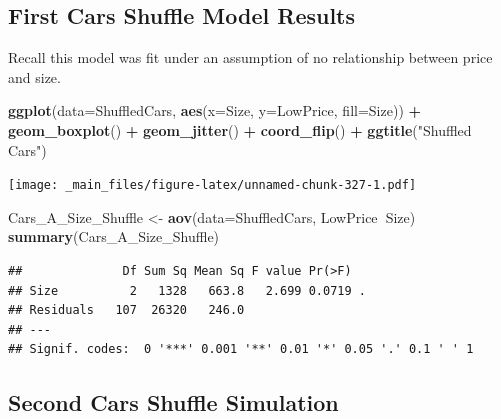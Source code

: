 \documentclass[]{book}
\newenvironment{Shaded}{\begin{snugshade}}{\end{snugshade}}
\newcommand{\KeywordTok}[1]{\textcolor[rgb]{0.13,0.29,0.53}{\textbf{#1}}}
\newcommand{\DataTypeTok}[1]{\textcolor[rgb]{0.13,0.29,0.53}{#1}}
\newcommand{\DecValTok}[1]{\textcolor[rgb]{0.00,0.00,0.81}{#1}}
\newcommand{\StringTok}[1]{\textcolor[rgb]{0.31,0.60,0.02}{#1}}
\newcommand{\OperatorTok}[1]{\textcolor[rgb]{0.81,0.36,0.00}{\textbf{#1}}}
\newcommand{\NormalTok}[1]{#1}
\begin{document}
\subsection{First Cars Shuffle Model
Results}\label{first-cars-shuffle-model-results-1}

Recall this model was fit under an assumption of no relationship between
price and size.

\begin{Shaded}
\begin{Highlighting}[]
\KeywordTok{ggplot}\NormalTok{(}\DataTypeTok{data=}\NormalTok{ShuffledCars, }\KeywordTok{aes}\NormalTok{(}\DataTypeTok{x=}\NormalTok{Size, }\DataTypeTok{y=}\NormalTok{LowPrice, }\DataTypeTok{fill=}\NormalTok{Size)) }\OperatorTok{+}\StringTok{ }
\StringTok{  }\KeywordTok{geom_boxplot}\NormalTok{() }\OperatorTok{+}\StringTok{ }\KeywordTok{geom_jitter}\NormalTok{() }\OperatorTok{+}\StringTok{ }\KeywordTok{coord_flip}\NormalTok{() }\OperatorTok{+}\StringTok{ }\KeywordTok{ggtitle}\NormalTok{(}\StringTok{"Shuffled Cars"}\NormalTok{)}
\end{Highlighting}
\end{Shaded}

\texttt{[image: \_main\_files/figure-latex/unnamed-chunk-327-1.pdf]}

\begin{Shaded}
\begin{Highlighting}[]
\NormalTok{Cars_A_Size_Shuffle <-}\StringTok{ }\KeywordTok{aov}\NormalTok{(}\DataTypeTok{data=}\NormalTok{ShuffledCars, LowPrice}\OperatorTok{~}\NormalTok{Size)}
\KeywordTok{summary}\NormalTok{(Cars_A_Size_Shuffle)}
\end{Highlighting}
\end{Shaded}

\begin{verbatim}
##              Df Sum Sq Mean Sq F value Pr(>F)  
## Size          2   1328   663.8   2.699 0.0719 .
## Residuals   107  26320   246.0                 
## ---
## Signif. codes:  0 '***' 0.001 '**' 0.01 '*' 0.05 '.' 0.1 ' ' 1
\end{verbatim}

\subsection{Second Cars Shuffle
Simulation}\label{second-cars-shuffle-simulation-1}

\begin{Shaded}
\end{Shaded}
\end{document}
